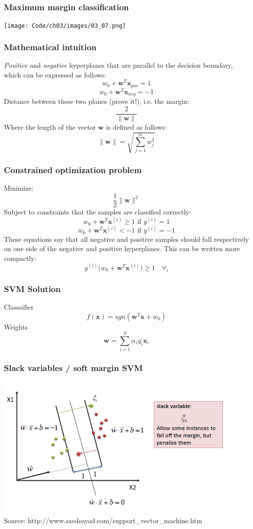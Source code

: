 \documentclass{beamer}
\begin{document}
\begin{frame}
  \frametitle{Maximum margin classification}
  \texttt{[image: Code/ch03/images/03\_07.png]}
\end{frame}

\begin{frame}
  \frametitle{Mathematical intuition}
  \textit{Positive} and \textit{negative} hyperplanes that are parallel to the decision boundary, which can be expressed as follows:
  \[
  w_0 + \mathbf{w}^T \mathbf{x}_{pos} = 1
  \]
  \[
  w_0 + \mathbf{w}^T \mathbf{x}_{neg} = -1
  \]
  Distance between these two planes (prove it!), i.e. the margin:
  \[
  \frac{2}{\lVert \mathbf{w} \rVert}
  \]
  Where the length of the vector $\mathbf{w}$ is defined as follows:
  \[
  \lVert \mathbf{w} \rVert = \sqrt{\sum_{j=1}^{m} w_{j}^{2}} 
  \]
\end{frame}

\begin{frame}
  \frametitle{Constrained optimization problem}
  Minimize:
  \[
  \frac{1}{2} \lVert \mathbf{w} \rVert^2
  \]
  Subject to constraints that the samples are classified correctly:
  \[
  w_0 + \mathbf{w}^T \mathbf{x}^{(i)} \ge 1 \text{ if } y^{(i)} = 1
  \]
  \[
  w_0 + \mathbf{w}^T \mathbf{x}^{(i)}  < -1 \text{ if } y^{(i)} = -1
  \]
  These equations say that all negative and positive samples should fall respectively on one side of the negative and positive hyperplanes. This can be written more compactly:
  \[
  y^{(i)} \big(  w_0 + \mathbf{w}^T \mathbf{x}^{(i)} \big) \ge 1 \quad \forall_i
  \]
\end{frame}

\begin{frame}
  \frametitle{SVM Solution}
  Classsifier
  \[
  f(\mathbf{x}) = sgn(\mathbf{w}^T \mathbf{x} + w_0)
  \]
  Weights
  \[
  \mathbf{w} = \sum_{i=1}^N \alpha_i y_i \mathbf{x}_i
  \]
\end{frame}

\begin{frame}
  \frametitle{Slack variables / soft margin SVM}
  \includegraphics[width=\textwidth]{Images/svm-slack.png}
  \\
  \tiny{Source: http://www.saedsayad.com/support\_vector\_machine.htm}
\end{frame}
\end{document}
